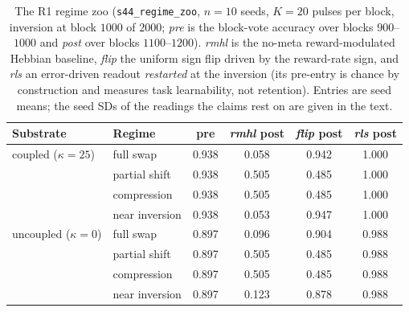 \documentclass[preprint,12pt]{elsarticle}
\begin{document}
\begin{table}[t]
\centering
\footnotesize
\caption{The R1 regime zoo (\texttt{s44\_regime\_zoo}, $n=10$ seeds, $K=20$
pulses per block, inversion at block $1000$ of $2000$; \emph{pre} is the
block-vote accuracy over blocks $900$--$1000$ and \emph{post} over blocks
$1100$--$1200$). \textit{rmhl} is the no-meta reward-modulated Hebbian
baseline, \textit{flip} the uniform sign flip driven by the reward-rate sign,
and \textit{rls} an error-driven readout \emph{restarted} at the inversion
(its pre-entry is chance by construction and measures task learnability, not
retention). Entries are seed means; the seed SDs of the readings the claims
rest on are given in the text.}
\label{tab:zoo}
\begin{tabular}{@{}llcccc@{}}
\toprule
Substrate & Regime & pre & \textit{rmhl} post & \textit{flip} post &
\textit{rls} post \\
\midrule
coupled ($\kappa=25$) & full swap & 0.938 & 0.058 & 0.942 & 1.000 \\
 & partial shift & 0.938 & 0.505 & 0.485 & 1.000 \\
 & compression & 0.938 & 0.505 & 0.485 & 1.000 \\
 & near inversion & 0.938 & 0.053 & 0.947 & 1.000 \\
\midrule
uncoupled ($\kappa=0$) & full swap & 0.897 & 0.096 & 0.904 & 0.988 \\
 & partial shift & 0.897 & 0.505 & 0.485 & 0.988 \\
 & compression & 0.897 & 0.505 & 0.485 & 0.988 \\
 & near inversion & 0.897 & 0.123 & 0.878 & 0.988 \\
\bottomrule
\end{tabular}
\end{table}
\end{document}
